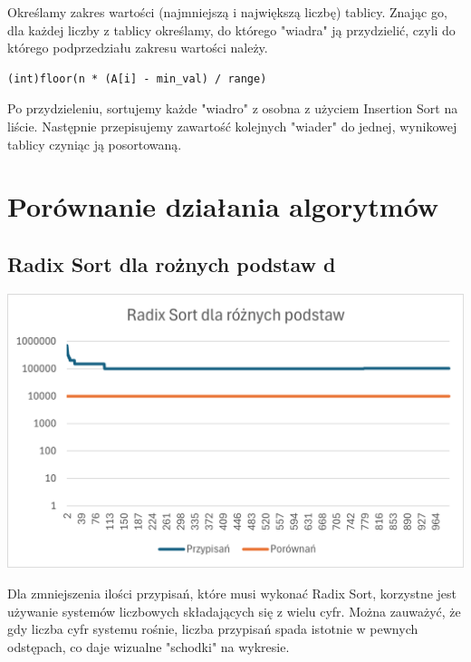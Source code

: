 \documentclass{article}
\begin{document}
Określamy zakres wartości (najmniejszą i największą liczbę) tablicy. Znając go, dla każdej liczby z tablicy określamy, do którego "wiadra" ją przydzielić, czyli do którego podprzedziału zakresu wartości należy. \begin{verbatim}(int)floor(n * (A[i] - min_val) / range)\end{verbatim} Po przydzieleniu, sortujemy każde "wiadro" z osobna z użyciem Insertion Sort na liście. Następnie przepisujemy zawartość kolejnych "wiader" do jednej, wynikowej tablicy czyniąc ją posortowaną.

\section{Porównanie działania algorytmów}

\subsection{Radix Sort dla rożnych podstaw d}

\begin{center}
    \includegraphics[width=1\textwidth]{RadixSort.png}
\end{center}

Dla zmniejszenia ilości przypisań, które musi wykonać Radix Sort, korzystne jest używanie systemów liczbowych składających się z wielu cyfr. Można zauważyć, że gdy liczba cyfr systemu rośnie, liczba przypisań spada istotnie w pewnych odstępach, co daje wizualne "schodki" na wykresie.
\end{document}
